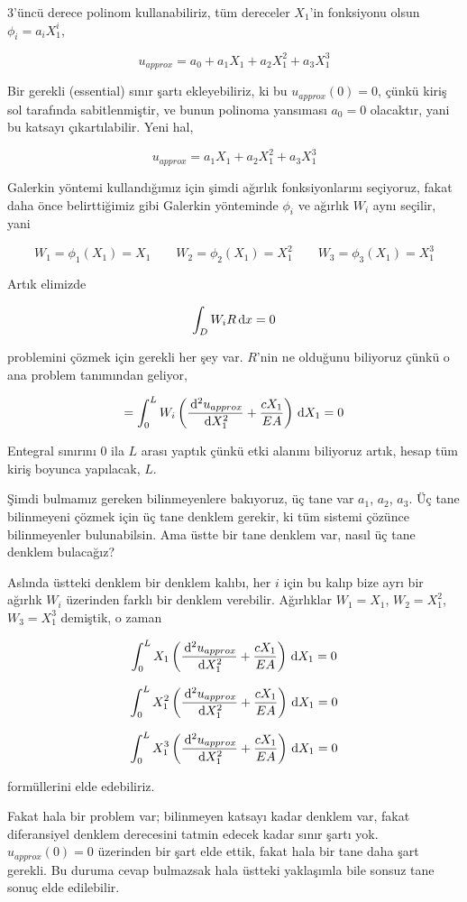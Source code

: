 \documentclass[12pt,fleqn]{article}\usepackage{../../common}
\begin{document}
3'üncü derece polinom kullanabiliriz, tüm dereceler $X_1$'in fonksiyonu olsun
$\phi_i = a_i X_1^i$, 

$$
u_{approx} = a_0 + a_1 X_1 + a_2 X_1^2 + a_3 X_1^3 
$$

Bir gerekli (essential) sınır şartı ekleyebiliriz, ki bu $u_{approx}(0)=0$,
çünkü kiriş sol tarafında sabitlenmiştir, ve bunun polinoma yansıması
$a_0=0$ olacaktır, yani bu katsayı çıkartılabilir. Yeni hal,

$$
u_{approx} = a_1 X_1 + a_2 X_1^2 + a_3 X_1^3 
$$

Galerkin yöntemi kullandığımız için şimdi ağırlık fonksiyonlarını seçiyoruz,
fakat daha önce belirttiğimiz gibi Galerkin yönteminde $\phi_i$ ve ağırlık $W_i$
aynı seçilir, yani

$$
W_1 = \phi_1(X_1) = X_1 \qquad 
W_2 = \phi_2(X_1) = X_1^2 \qquad 
W_3 = \phi_3(X_1) = X_1^3
$$

Artık elimizde 

$$
\int_D W_i R \,\mathrm{d} x = 0
$$

problemini çözmek için gerekli her şey var. $R$'nin ne olduğunu biliyoruz
çünkü o ana problem tanımından geliyor,

$$
= \int_{0}^{L} W_i
\left(
 \frac{\,\mathrm{d}^2 u_{approx}}{\,\mathrm{d} X_1^2} + \frac{c X_1}{EA}
\right) \,\mathrm{d} X_1 = 0
$$

Entegral sınırını 0 ila $L$ arası yaptık çünkü etki alanını biliyoruz artık,
hesap tüm kiriş boyunca yapılacak, $L$.

Şimdi bulmamız gereken bilinmeyenlere bakıyoruz, üç tane var $a_1$, $a_2$,
$a_3$. Üç tane bilinmeyeni çözmek için üç tane denklem gerekir, ki tüm sistemi
çözünce bilinmeyenler bulunabilsin. Ama üstte bir tane denklem var, nasıl
üç tane denklem bulacağız?

Aslında üstteki denklem bir denklem kalıbı, her $i$ için bu kalıp bize ayrı bir
ağırlık $W_i$ üzerinden farklı bir denklem verebilir. Ağırlıklar $W_1 = X_1$,
$W_2 = X_1^2$, $W_3 = X_1^3$ demiştik, o zaman 

$$
\int_{0}^{L} X_1 \left( \frac{\,\mathrm{d}^2 u_{approx}}{\,\mathrm{d} X_1^2} + \frac{c X_1}{EA}  \right) \,\mathrm{d} X_1 = 0
$$

$$
\int_{0}^{L} X_1^2 \left( \frac{\,\mathrm{d}^2 u_{approx}}{\,\mathrm{d} X_1^2} + \frac{c X_1}{EA}  \right) \,\mathrm{d} X_1 = 0
$$

$$
\int_{0}^{L} X_1^3 \left( \frac{\,\mathrm{d}^2 u_{approx}}{\,\mathrm{d} X_1^2} + \frac{c X_1}{EA}  \right) \,\mathrm{d} X_1 = 0
$$

formüllerini elde edebiliriz.

Fakat hala bir problem var; bilinmeyen katsayı kadar denklem var, fakat
diferansiyel denklem derecesini tatmin edecek kadar sınır şartı
yok. $u_{approx}(0)=0$ üzerinden bir şart elde ettik, fakat hala bir tane
daha şart gerekli. Bu duruma cevap bulmazsak hala üstteki yaklaşımla bile
sonsuz tane sonuç elde edilebilir.
\end{document}
